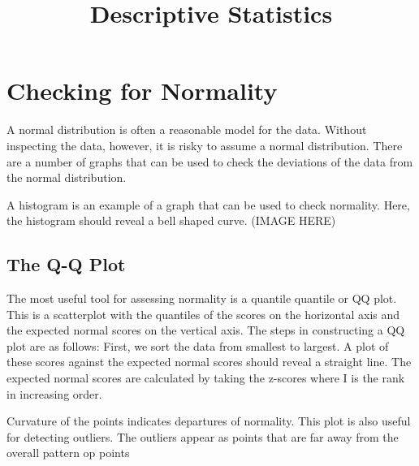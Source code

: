 \documentclass[12pt, a4paper]{report}
\title{Descriptive Statistics}
\begin{document}
\section*{Checking for Normality}

A normal distribution is often a reasonable model for the data. Without inspecting the data, however, it is risky to assume a normal distribution. There are a number of graphs that can be used to check the deviations of the data from the normal distribution. 

A histogram is an example of a graph that can be used to check normality. Here, the histogram should reveal a bell shaped curve. (IMAGE HERE)

\subsection*{The Q-Q Plot}



The most useful tool for assessing normality is a quantile quantile or QQ plot. This is a scatterplot with the quantiles of the scores on the horizontal axis and the expected normal scores on the vertical axis. The steps in constructing a QQ plot are as follows: First, we sort the data from smallest to largest. A plot of these scores against the expected normal scores should reveal a straight line. The expected normal scores are calculated by taking the z-scores  where I is the rank in increasing order.

Curvature of the points indicates departures of normality. This plot is also useful for detecting outliers. The outliers appear as points that are far away from the overall pattern op points
\end{document}
